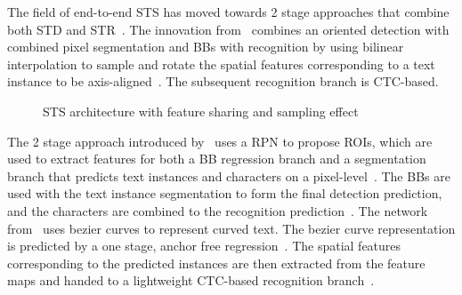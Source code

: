The field of end-to-end \ac{STS} has moved towards 2 stage approaches that combine both \ac{STD}
and \ac{STR}~\citep{lyu_mask_2018,long_scene_2021}.
The innovation from~\cite{liu_fots_2018} combines an oriented detection with combined pixel
segmentation and \acp{BB} with recognition by using bilinear interpolation to sample and rotate
the spatial features corresponding to a text instance to be axis-aligned~\citep{liu_fots_2018}.
The subsequent recognition branch is \ac{CTC}-based.
\begin{figure}[hb]
    \centering
    \caption[STS architecture with feature sharing]{%
        STS architecture with feature sharing and sampling
        effect~\citep{liu_fots_2018}\label{fig:2-stage-example-LIU-Fots-2018}
    }
\end{figure}
The 2 stage approach introduced by~\cite{lyu_mask_2018} uses a \ac{RPN} to propose \acp{ROI},
which are used to extract features for both a \ac{BB} regression branch and a segmentation branch
that predicts text instances and characters on a pixel-level~\citep{lyu_mask_2018}.
The \acp{BB} are used with the text instance segmentation to form the final detection prediction, and
the characters are combined to the recognition prediction~\citep{lyu_mask_2018}.
The network from~\cite{liu_abcnet_2020} uses bezier curves to represent curved text.
The bezier curve representation is predicted by a one stage, anchor free
regression~\citep{liu_abcnet_2020}.
The spatial features corresponding to the predicted instances are then extracted from the feature
maps and handed to a lightweight \ac{CTC}-based recognition branch~\citep{lyu_mask_2018}.
